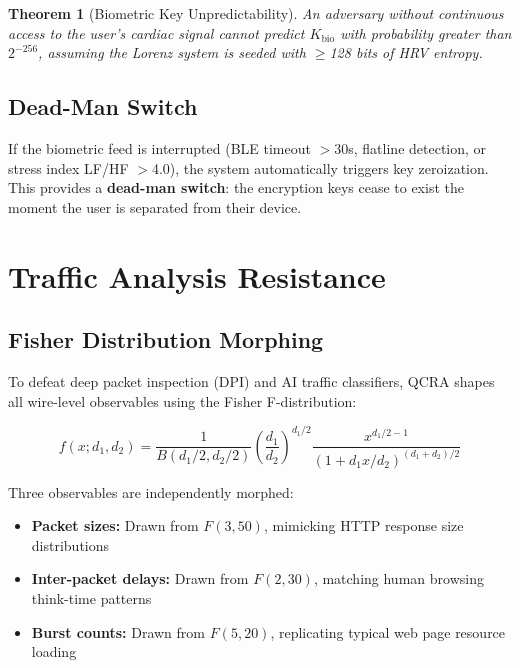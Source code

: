 \documentclass[11pt,a4paper]{article}
\newtheorem{theorem}{Theorem}[section]
\begin{document}
\begin{theorem}[Biometric Key Unpredictability]
An adversary without continuous access to the user's cardiac signal
cannot predict $K_{\text{bio}}$ with probability greater than $2^{-256}$,
assuming the Lorenz system is seeded with $\geq$128 bits of HRV entropy.
\end{theorem}

\subsection{Dead-Man Switch}

If the biometric feed is interrupted (BLE timeout $>$30s, flatline
detection, or stress index LF/HF $>$4.0), the system automatically
triggers key zeroization. This provides a \textbf{dead-man switch}:
the encryption keys cease to exist the moment the user is separated
from their device.

\section{Traffic Analysis Resistance}
\label{sec:traffic}

\subsection{Fisher Distribution Morphing}

To defeat deep packet inspection (DPI) and AI traffic classifiers,
QCRA shapes all wire-level observables using the Fisher F-distribution:

\begin{equation}
f(x; d_1, d_2) = \frac{1}{B(d_1/2, d_2/2)}
\left(\frac{d_1}{d_2}\right)^{d_1/2}
\frac{x^{d_1/2 - 1}}{(1 + d_1 x/d_2)^{(d_1+d_2)/2}}
\end{equation}

Three observables are independently morphed:
\begin{itemize}[nosep]
  \item \textbf{Packet sizes:} Drawn from $F(3, 50)$, mimicking HTTP
    response size distributions
  \item \textbf{Inter-packet delays:} Drawn from $F(2, 30)$, matching
    human browsing think-time patterns
  \item \textbf{Burst counts:} Drawn from $F(5, 20)$, replicating
    typical web page resource loading
\end{itemize}
\end{document}
